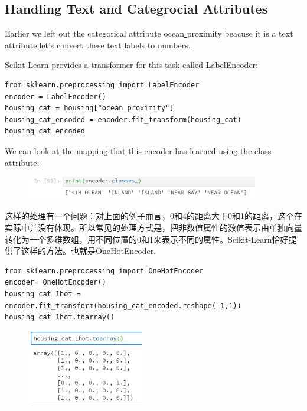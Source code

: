 \documentclass[UTF8]{ctexart}
\begin{document}
\subsection{Handling Text and Categrocial Attributes}

Earlier we left out the categorical attribute ocean\underline{ }proximity beacuse it is a text attribute,let's convert these text labels to numbers.

Scikit-Learn provides a transformer for this task called LabelEncoder:

\begin{lstlisting}
from sklearn.preprocessing import LabelEncoder
encoder = LabelEncoder()
housing_cat = housing["ocean_proximity"]
housing_cat_encoded = encoder.fit_transform(housing_cat)
housing_cat_encoded
\end{lstlisting}

We can look at the mapping that this encoder has learned using the class\underline{} attribute:

\begin{figure}[H]
\centering
\includegraphics[width = 4in]{encoder_class.JPG}
\end{figure}

这样的处理有一个问题：对上面的例子而言，0和4的距离大于0和1的距离，这个在实际中并没有体现。所以常见的处理方式是，把非数值属性的数值表示由单独向量转化为一个多维数组，用不同位置的0和1来表示不同的属性。Scikit-Learn恰好提供了这样的方法。也就是OneHotEncoder.

\begin{lstlisting}
from sklearn.preprocessing import OneHotEncoder
encoder= OneHotEncoder()
housing_cat_1hot = encoder.fit_transform(housing_cat_encoded.reshape(-1,1))
housing_cat_1hot.toarray()
\end{lstlisting}


\begin{figure}[H]
\centering
\includegraphics[width = 2in]{Onehot.JPG}
\end{figure}
\end{document}
